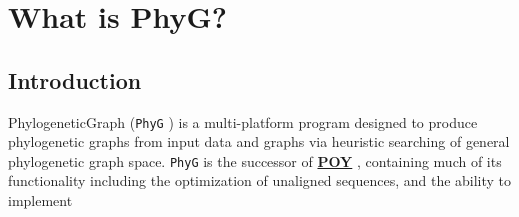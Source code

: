 \documentclass[11pt]{book}
\newcommand{\phyg}{\texttt{PhyG} }
\begin{document}
	\tableofcontents

\chapter{What is PhyG?}
	\section{Introduction}
	PhylogeneticGraph (\phyg) is a multi-platform program designed to produce phylogenetic 
	graphs from input data and graphs via heuristic searching of general phylogenetic graph 
	space. \texttt{PhyG} is the successor of \href{https://github.com/wardwheeler/POY5}{\textbf{POY}}
	\citep{POY2,POY3,POY4,Varonetal2010,POY5, Wheeleretal2015}, containing much of its 
	functionality including the optimization of unaligned sequences, and the ability to implement 
\end{document}
